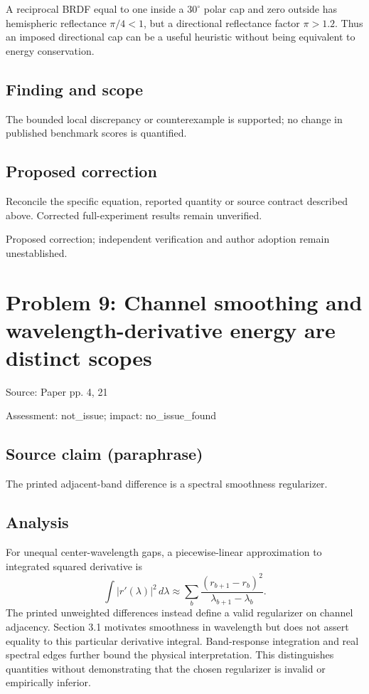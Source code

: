 \documentclass[11pt]{article}
\begin{document}
A reciprocal BRDF equal to one inside a \(30^\circ\) polar cap and zero outside has hemispheric reflectance \(\pi/4<1\), but a directional reflectance factor \(\pi>1.2\). Thus an imposed directional cap can be a useful heuristic without being equivalent to energy conservation.

\subsection*{Finding and scope}

The bounded local discrepancy or counterexample is supported; no change in published benchmark scores is quantified.

\subsection*{Proposed correction}

Reconcile the specific equation, reported quantity or source contract described above. Corrected full-experiment results remain unverified.

Proposed correction; independent verification and author adoption remain unestablished.

\section*{Problem 9: Channel smoothing and wavelength-derivative energy are distinct scopes}

Source: Paper pp. 4, 21

Assessment: not\_issue; impact: no\_issue\_found

\subsection*{Source claim (paraphrase)}

The printed adjacent-band difference is a spectral smoothness regularizer.

\subsection*{Analysis}

For unequal center-wavelength gaps, a piecewise-linear approximation to integrated squared derivative is \[\int |r\prime(\lambda)|^2\,d\lambda\approx\sum_b\frac{(r_{b+1}-r_b)^2}{\lambda_{b+1}-\lambda_b}.\] The printed unweighted differences instead define a valid regularizer on channel adjacency. Section 3.1 motivates smoothness in wavelength but does not assert equality to this particular derivative integral. Band-response integration and real spectral edges further bound the physical interpretation. This distinguishes quantities without demonstrating that the chosen regularizer is invalid or empirically inferior.
\end{document}
